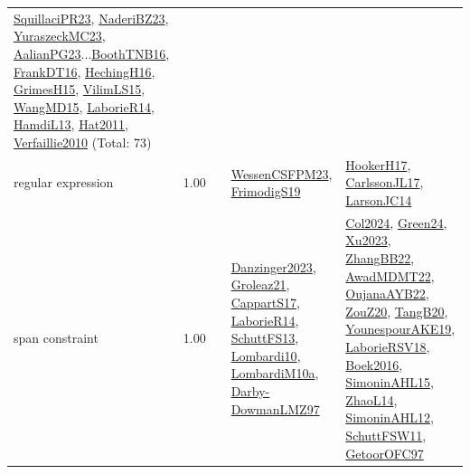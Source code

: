 {\begin{longtable}{p{3cm}r>{\raggedright\arraybackslash}p{6cm}>{\raggedright\arraybackslash}p{6cm}>{\raggedright\arraybackslash}p{8cm}}
\hyperref[detail:SquillaciPR23]{SquillaciPR23}, \hyperref[detail:NaderiBZ23]{NaderiBZ23}, \hyperref[detail:YuraszeckMC23]{YuraszeckMC23}, \hyperref[detail:AalianPG23]{AalianPG23}...\hyperref[detail:BoothTNB16]{BoothTNB16}, \hyperref[detail:FrankDT16]{FrankDT16}, \hyperref[detail:HechingH16]{HechingH16}, \hyperref[detail:GrimesH15]{GrimesH15}, \hyperref[detail:VilimLS15]{VilimLS15}, \hyperref[detail:WangMD15]{WangMD15}, \hyperref[detail:LaborieR14]{LaborieR14}, \hyperref[detail:HamdiL13]{HamdiL13}, \hyperref[detail:Hat2011]{Hat2011}, \hyperref[detail:Verfaillie2010]{Verfaillie2010} (Total: 73)\\
\index{regular expression}\index{Constraints!regular expression}regular expression &  1.00 &  & \hyperref[detail:WessenCSFPM23]{WessenCSFPM23}, \hyperref[detail:FrimodigS19]{FrimodigS19} & \hyperref[detail:HookerH17]{HookerH17}, \hyperref[detail:CarlssonJL17]{CarlssonJL17}, \hyperref[detail:LarsonJC14]{LarsonJC14}\\
\index{span constraint}\index{Constraints!span constraint}span constraint &  1.00 &  & \hyperref[detail:Danzinger2023]{Danzinger2023}, \hyperref[detail:Groleaz21]{Groleaz21}, \hyperref[detail:CappartS17]{CappartS17}, \hyperref[detail:LaborieR14]{LaborieR14}, \hyperref[detail:SchuttFS13]{SchuttFS13}, \hyperref[detail:Lombardi10]{Lombardi10}, \hyperref[detail:LombardiM10a]{LombardiM10a}, \hyperref[detail:Darby-DowmanLMZ97]{Darby-DowmanLMZ97} & \hyperref[detail:Col2024]{Col2024}, \hyperref[detail:Green24]{Green24}, \hyperref[detail:Xu2023]{Xu2023}, \hyperref[detail:ZhangBB22]{ZhangBB22}, \hyperref[detail:AwadMDMT22]{AwadMDMT22}, \hyperref[detail:OujanaAYB22]{OujanaAYB22}, \hyperref[detail:ZouZ20]{ZouZ20}, \hyperref[detail:TangB20]{TangB20}, \hyperref[detail:YounespourAKE19]{YounespourAKE19}, \hyperref[detail:LaborieRSV18]{LaborieRSV18}, \hyperref[detail:Boek2016]{Boek2016}, \hyperref[detail:SimoninAHL15]{SimoninAHL15}, \hyperref[detail:ZhaoL14]{ZhaoL14}, \hyperref[detail:SimoninAHL12]{SimoninAHL12}, \hyperref[detail:SchuttFSW11]{SchuttFSW11}, \hyperref[detail:GetoorOFC97]{GetoorOFC97}\\

\end{longtable}}
